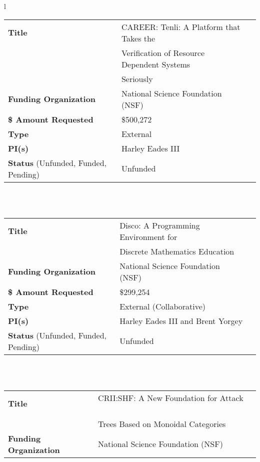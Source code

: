\documentclass[11pt]{article}
\begin{document}
    \begin{tabular}{l}
      \begin{tabular}{|l|l|l|}
          \hline
          \textbf{Title} & CAREER: Tenli: A Platform that Takes the\,\,\,\,\,\,\, \\
          & Verification of Resource Dependent Systems \\
          & Seriously\\
          \hline
          \textbf{Funding Organization} & National Science Foundation (NSF)\\
          \hline
          \textbf{\$ Amount Requested} & \$500,272\\
          \hline
          \textbf{Type} & External\\
          \hline
          \textbf{PI(s)} & Harley Eades III\\
          \hline
          \textbf{Status} (Unfunded, Funded, Pending) & Unfunded\\
          \hline
        \end{tabular}\\
        \\        
      \begin{tabular}{|l|l|l|}
          \hline
          \textbf{Title} & Disco: A Programming Environment for \,\,\,\,\,\,\,\,\,\,\,\,\,\,\,\,\\
          & Discrete Mathematics Education \\
          \hline
          \textbf{Funding Organization} & National Science Foundation (NSF)\\
          \hline
          \textbf{\$ Amount Requested} & \$299,254\\
          \hline
          \textbf{Type} & External (Collaborative)\\
          \hline
          \textbf{PI(s)} & Harley Eades III and Brent Yorgey\\
          \hline
          \textbf{Status} (Unfunded, Funded, Pending) & Unfunded\\
          \hline
        \end{tabular}\\
        \\
      \begin{tabular}{|l|l|l|}
          \hline
          \textbf{Title} & CRII:SHF: A New Foundation for Attack \,\,\,\,\,\,\,\,\,\,\,\,\,\\
          &  Trees Based on Monoidal  Categories\\
          \hline
          \textbf{Funding Organization} & National Science Foundation (NSF)\\

\end{tabular}
\end{tabular}
\end{document}

